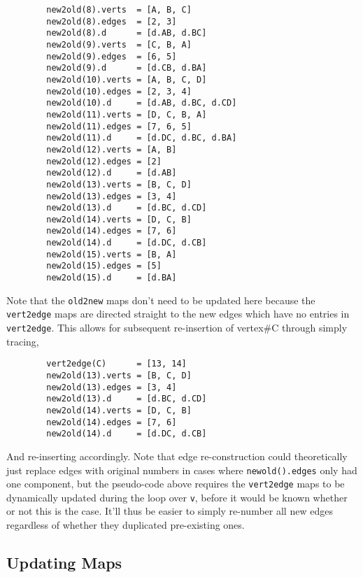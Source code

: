 \begin{spacing}{1.5}
\begin{lstlisting}
        new2old(8).verts  = [A, B, C]
        new2old(8).edges  = [2, 3]
        new2old(8).d      = [d.AB, d.BC]
        new2old(9).verts  = [C, B, A]
        new2old(9).edges  = [6, 5]
        new2old(9).d      = [d.CB, d.BA]
        new2old(10).verts = [A, B, C, D]
        new2old(10).edges = [2, 3, 4]
        new2old(10).d     = [d.AB, d.BC, d.CD]
        new2old(11).verts = [D, C, B, A]
        new2old(11).edges = [7, 6, 5]
        new2old(11).d     = [d.DC, d.BC, d.BA]
        new2old(12).verts = [A, B]
        new2old(12).edges = [2]
        new2old(12).d     = [d.AB]
        new2old(13).verts = [B, C, D]
        new2old(13).edges = [3, 4]
        new2old(13).d     = [d.BC, d.CD]
        new2old(14).verts = [D, C, B]
        new2old(14).edges = [7, 6]
        new2old(14).d     = [d.DC, d.CB]
        new2old(15).verts = [B, A]
        new2old(15).edges = [5]
        new2old(15).d     = [d.BA]
    \end{lstlisting}
    Note that the {\tt old2new} maps don't need to be updated here because the {\tt vert2edge} maps are directed straight to the new edges which
    have no entries in {\tt vert2edge}. This allows for subsequent re-insertion of vertex\#C through simply tracing,
    \begin{lstlisting}
        vert2edge(C)      = [13, 14]
        new2old(13).verts = [B, C, D]
        new2old(13).edges = [3, 4]
        new2old(13).d     = [d.BC, d.CD]
        new2old(14).verts = [D, C, B]
        new2old(14).edges = [7, 6]
        new2old(14).d     = [d.DC, d.CB]
    \end{lstlisting}
    And re-inserting accordingly.  Note that edge re-construction could theoretically just replace edges with original numbers in cases where
    {\tt newold().edges} only had one component, but the pseudo-code above requires the {\tt vert2edge} maps to be dynamically updated during
    the loop over {\tt v}, before it would be known whether or not this is the case. It'll thus be easier to simply re-number all new edges
    regardless of whether they duplicated pre-existing ones.


    \pagebreak
    \vspace{12pt}\subsection{Updating Maps}


\end{spacing}
